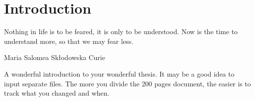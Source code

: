 
\chapter{Introduction}
\epigraph{Nothing in life is to be feared, it is only to be understood. Now is the time to understand more, so that we may fear less.}{Maria Salomea Skłodowska Curie}

A wonderful introduction to your wonderful thesis.
It may be a good idea to input separate files.
The more you divide the 200 pages document, the easier is to track what you changed and when.




